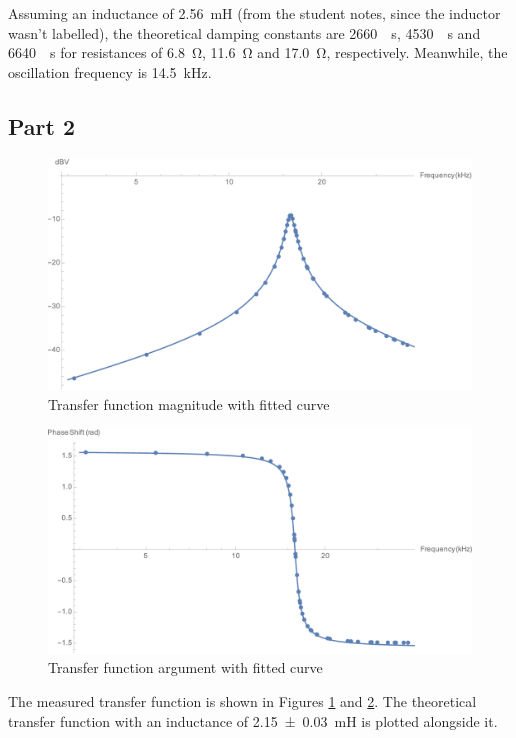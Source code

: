 \documentclass[a4paper]{scrartcl}
\begin{document}
Assuming an inductance of \SI{2.56}{\milli\henry} (from the student notes, since the inductor wasn't labelled), the theoretical damping constants are \SI{2660}{\per\second}, \SI{4530}{\per\second} and \SI{6640}{\per\second} for resistances of \SI{6.8}{\ohm}, \SI{11.6}{\ohm} and \SI{17.0}{\ohm}, respectively. Meanwhile, the oscillation frequency is \SI{14.5}{\kilo\hertz}.

\subsection{Part 2}
\begin{figure}
    \centering
    \includegraphics[width = 18cm]{part2-mag.png}
    \caption{Transfer function magnitude with fitted curve}
    \label{fig:part2-mag}
\end{figure}
\begin{figure}
    \centering
    \includegraphics[width = 18cm]{part2-arg.png}
    \caption{Transfer function argument with fitted curve}
    \label{fig:part2-arg}
\end{figure}

The measured transfer function is shown in Figures \ref{fig:part2-mag} and \ref{fig:part2-arg}. The theoretical transfer function with an inductance of \SI{2.15 \pm 0.03}{\milli\henry} is plotted alongside it.
\end{document}

